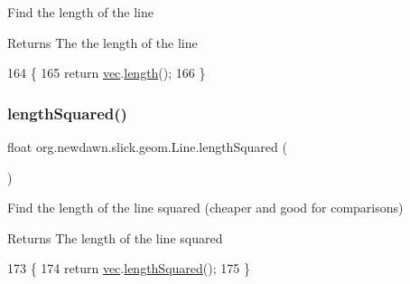 Find the length of the line

\begin{DoxyReturn}{Returns}
The the length of the line 
\end{DoxyReturn}

\begin{DoxyCode}
164                           \{
165         \textcolor{keywordflow}{return} \mbox{\hyperlink{classorg_1_1newdawn_1_1slick_1_1geom_1_1_line_ad7a92ee3401b8b07f490cf5cee1f71aa}{vec}}.\mbox{\hyperlink{classorg_1_1newdawn_1_1slick_1_1geom_1_1_vector2f_ada298fe38d235371020523e9655e9152}{length}}();
166     \}
\end{DoxyCode}
\mbox{\label{classorg_1_1newdawn_1_1slick_1_1geom_1_1_line_a123865d09aee1331de18b4263f5f5157}} 
\subsubsection{\texorpdfstring{length\+Squared()}{lengthSquared()}}
{\footnotesize\ttfamily float org.\+newdawn.\+slick.\+geom.\+Line.\+length\+Squared (\begin{DoxyParamCaption}{ }\end{DoxyParamCaption})\hspace{0.3cm}{\ttfamily [inline]}}

Find the length of the line squared (cheaper and good for comparisons)

\begin{DoxyReturn}{Returns}
The length of the line squared 
\end{DoxyReturn}

\begin{DoxyCode}
173                                  \{
174         \textcolor{keywordflow}{return} \mbox{\hyperlink{classorg_1_1newdawn_1_1slick_1_1geom_1_1_line_ad7a92ee3401b8b07f490cf5cee1f71aa}{vec}}.\mbox{\hyperlink{classorg_1_1newdawn_1_1slick_1_1geom_1_1_vector2f_a1c4197040609de8f2ef13fc3342ee7da}{lengthSquared}}();
175     \}
\end{DoxyCode}
\mbox{\label{classorg_1_1newdawn_1_1slick_1_1geom_1_1_line_a7befe965e7a9b1da6015609b2ae3b20a}} 
